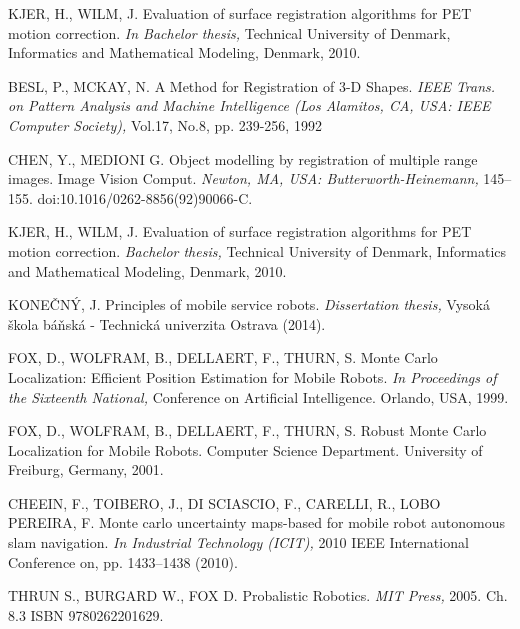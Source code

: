 \begin{thebibliography}{99}
	
 KJER, H., WILM, J.
Evaluation of surface registration algorithms for PET motion correction.
\textit{In Bachelor thesis,}
Technical University of Denmark, Informatics and
Mathematical Modeling, Denmark, 2010.

 BESL, P., MCKAY, N.
A Method for Registration of 3-D Shapes. 
\textit{IEEE Trans. on
Pattern Analysis and Machine Intelligence (Los Alamitos, CA, USA: IEEE Computer Society),}
Vol.17, No.8, pp. 239-256, 1992

 CHEN, Y., MEDIONI G.
Object modelling by registration of multiple range images. Image Vision Comput. 
\textit{Newton, MA, USA: Butterworth-Heinemann,}
145–155. doi:10.1016/0262-8856(92)90066-C.

 KJER, H., WILM, J.
Evaluation of surface registration algorithms for PET motion correction.
\textit{Bachelor thesis, }
Technical University of Denmark, Informatics and
Mathematical Modeling, Denmark, 2010.

 KONEČNÝ, J.
Principles of mobile service robots.
\textit{Dissertation thesis,}
Vysoká škola báňská - Technická univerzita Ostrava (2014).


 FOX, D., WOLFRAM, B., DELLAERT, F., THURN, S.
Monte Carlo Localization: Efficient Position Estimation for Mobile Robots.
\textit{In Proceedings of the Sixteenth National,}
Conference on Artificial Intelligence. Orlando, USA, 1999.

 FOX, D., WOLFRAM, B., DELLAERT, F., THURN, S.
Robust Monte Carlo Localization for Mobile Robots.
Computer Science Department. University of Freiburg, Germany, 2001.

 CHEEIN, F., TOIBERO, J., DI SCIASCIO, F., CARELLI, R., LOBO PEREIRA, F.
Monte carlo uncertainty maps-based for mobile robot autonomous slam navigation. 
\textit{In Industrial Technology (ICIT),}
2010 IEEE International Conference on, pp. 1433–1438 (2010).

 THRUN S., BURGARD W., FOX D.
Probalistic Robotics.
\textit{MIT Press,}
2005. Ch. 8.3 ISBN 9780262201629.


\end{thebibliography}
